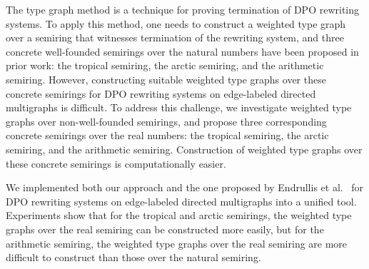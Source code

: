 The type graph method is a technique for proving termination of DPO rewriting systems. 
To apply this method, one needs to construct a weighted type graph over a semiring that witnesses termination of the rewriting system, and three concrete well-founded semirings over the natural numbers have been proposed in prior work: the tropical semiring, the arctic semiring, and the arithmetic semiring.
However, constructing suitable weighted type graphs over these concrete semirings for DPO rewriting systems on edge-labeled directed multigraphs is difficult. 
To address this challenge, we investigate weighted type graphs over non-well-founded semirings, and propose three corresponding concrete semirings over the real numbers: the tropical semiring, the arctic semiring, and the arithmetic semiring. Construction of weighted type graphs over these concrete semirings is computationally easier.
    
We implemented both our approach and the one proposed by Endrullis et al.~\cite{endrullis2024generalized_arxiv_v2} for DPO rewriting systems on edge-labeled directed multigraphs into a unified tool. Experiments show that for the tropical and arctic semirings, the weighted type graphs over the real semiring can be constructed more easily, but for the arithmetic semiring, the weighted type graphs over the real semiring are more difficult to construct than those over the natural semiring.

  